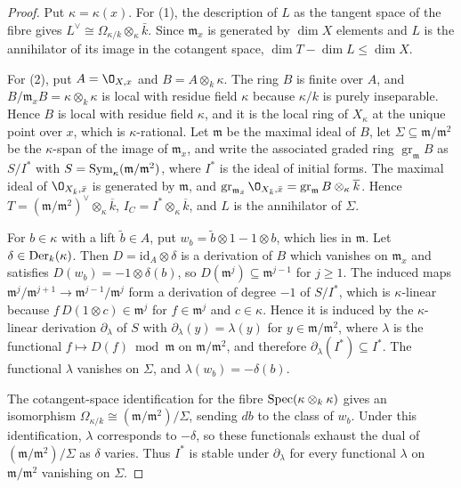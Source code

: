 \begin{proof}
Put $\kappa = \kappa(x)$.
For (1), the description of $L$ as the tangent space of the fibre gives $L^\vee\cong\Omega_{\kappa/k}\otimes_\kappa\bar k$.
Since $\mathfrak m_x$ is generated by $\dim X$ elements and $L$ is the annihilator of its image in the cotangent space, $\dim T-\dim L\leq\dim X$.

For (2), put $A = \O_{X,x}$ and $B = A\otimes_k\kappa$.
The ring $B$ is finite over $A$, and $B/\mathfrak m_xB = \kappa\otimes_k\kappa$ is local with residue field $\kappa$ because $\kappa/k$ is purely inseparable.
Hence $B$ is local with residue field $\kappa$, and it is the local ring of $X_\kappa$ at the unique point over $x$, which is $\kappa$-rational.
Let $\mathfrak m$ be the maximal ideal of $B$, let $\Sigma\subseteq\mathfrak m/\mathfrak m^2$ be the $\kappa$-span of the image of $\mathfrak m_x$, and write the associated graded ring $\operatorname{gr}_{\mathfrak m}B$ as $S/I^*$ with $S = \operatorname{Sym}_\kappa(\mathfrak m/\mathfrak m^2)$, where $I^*$ is the ideal of initial forms.
The maximal ideal of $\O_{X_{\bar k},\bar x}$ is generated by $\mathfrak m$, and $\operatorname{gr}_{\mathfrak m_{\bar x}}\O_{X_{\bar k},\bar x} = \operatorname{gr}_{\mathfrak m}B\otimes_\kappa\overline k$.
Hence $T = (\mathfrak m/\mathfrak m^2)^\vee\otimes_\kappa\overline k$, $I_C = I^*\otimes_\kappa\overline k$, and $L$ is the annihilator of $\Sigma$.

For $b\in\kappa$ with a lift $\tilde b\in A$, put $w_b = \tilde b\otimes 1-1\otimes b$, which lies in $\mathfrak m$.
Let $\delta\in\operatorname{Der}_k(\kappa)$.
Then $D = \mathrm{id}_A\otimes\delta$ is a derivation of $B$ which vanishes on $\mathfrak m_x$ and satisfies $D(w_b) = -1\otimes\delta(b)$, so $D(\mathfrak m^j)\subseteq\mathfrak m^{j-1}$ for $j\geq 1$.
The induced maps $\mathfrak m^j/\mathfrak m^{j+1}\to\mathfrak m^{j-1}/\mathfrak m^j$ form a derivation of degree $-1$ of $S/I^*$, which is $\kappa$-linear because $f\,D(1\otimes c)\in\mathfrak m^j$ for $f\in\mathfrak m^j$ and $c\in\kappa$.
Hence it is induced by the $\kappa$-linear derivation $\partial_\lambda$ of $S$ with $\partial_\lambda(y) = \lambda(y)$ for $y\in\mathfrak m/\mathfrak m^2$, where $\lambda$ is the functional $f\mapsto D(f)\bmod\mathfrak m$ on $\mathfrak m/\mathfrak m^2$, and therefore $\partial_\lambda(I^*)\subseteq I^*$.
The functional $\lambda$ vanishes on $\Sigma$, and $\lambda(w_b) = -\delta(b)$.

The cotangent-space identification for the fibre $\operatorname{Spec}(\kappa\otimes_k\kappa)$ gives an isomorphism $\Omega_{\kappa/k}\cong(\mathfrak m/\mathfrak m^2)/\Sigma$, sending $db$ to the class of $w_b$.
Under this identification, $\lambda$ corresponds to $-\delta$, so these functionals exhaust the dual of $(\mathfrak m/\mathfrak m^2)/\Sigma$ as $\delta$ varies.
Thus $I^*$ is stable under $\partial_\lambda$ for every functional $\lambda$ on $\mathfrak m/\mathfrak m^2$ vanishing on $\Sigma$.


\end{proof}
